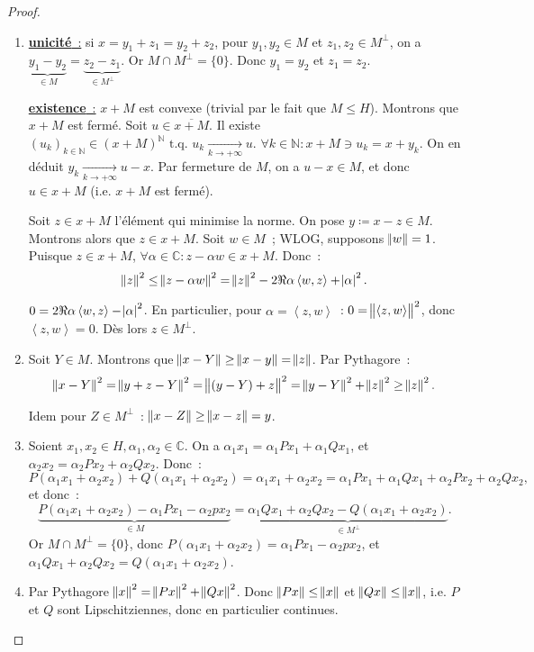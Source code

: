 \documentclass{report}
\newcommand{\C}{{\mathbb C}}
\newcommand{\N}{{\mathbb N}}
\newcommand{\scpr}[2]{\left\langle#1, #2\right\rangle}
\newcommand{\tq}{\text{ t.q. }}
\newcommand{\pinfty}{{+\infty}}
\newcommand{\unic}{{\underline {\textbf{unicité}~:}} }
\newcommand{\exis}{{\underline {\textbf{existence}~:}} }
\theoremstyle{definition}
\theoremstyle{remark}
\begin{document}
\begin{proof}~
\begin{enumerate}
	\item \unic si $x = y_1+z_1 = y_2+z_2$, pour $y_1,y_2 \in M$ et $z_1,z_2 \in M^\perp$, on a
	$\underbrace {y_1-y_2}_{\in M} = \underbrace {z_2-z_1}_{\in M^\perp}$. Or $M \cap M^\perp = \{0\}$. Donc $y_1=y_2$ et $z_1=z_2$.

 	\exis $x+M$ est convexe (trivial par le fait que $M \leq H$). Montrons que $x+M$ est fermé. Soit $u \in \overline {x+M}$.
	Il existe $(u_k)_{k \in \N} \in {(x+M)^\N} \tq u_k \xrightarrow[k \to \pinfty]{} u$. $\forall k \in \N : x+M \ni u_k = x + y_k$. On en déduit
	$y_k \xrightarrow[k \to \pinfty]{} u-x$. Par fermeture de $M$, on a $u-x \in M$, et donc $u \in x+M$ (i.e. $x+M$ est fermé).

	Soit $z \in x+M$ l'élément qui minimise la norme. On pose $y \coloneqq x-z \in M$. Montrons alors que $z \in x+M$. Soit $w \in M$~; WLOG, supposons $\norm w = 1$.
	Puisque $z \in x+M$, $\forall \alpha \in \C : z-\alpha w \in x+M$. Donc~:
	\[\norm z^2 \leq \norm {z-\alpha w}^2 = \norm z^2 - 2\Re\alpha\scpr wz + \abs\alpha^2.\]

	$0 = 2\Re\alpha\scpr wz - \abs\alpha^2$. En particulier, pour $\alpha = \scpr zw$~: $0 = \norm {\scpr zw}^2$, donc $\scpr zw = 0$. Dès lors $z \in M^\perp$.

	\item Soit $Y \in M$. Montrons que $\norm {x-Y} \geq \norm {x-y} = \norm z$. Par Pythagore~:
	\[\norm {x-Y}^2 = \norm {y+z-Y}^2 = \norm {(y-Y) + z}^2 = \norm {y-Y}^2 + \norm z^2 \geq \norm z^2.\]

	Idem pour $Z \in M^\perp$~: $\norm {x-Z} \geq \norm {x-z} = y$.

	\item Soient $x_1, x_2 \in H, \alpha_1, \alpha_2 \in \C$. On a $\alpha_1x_1 = \alpha_1Px_1 + \alpha_1Qx_1$, et $\alpha_2x_2 = \alpha_2Px_2 + \alpha_2Qx_2$. Donc~:
	\[P(\alpha_1x_1+\alpha_2x_2) + Q(\alpha_1x_1 + \alpha_2x_2) = \alpha_1x_1 + \alpha_2x_2 = \alpha_1Px_1 + \alpha_1Qx_1 + \alpha_2Px_2 + \alpha_2Qx_2,\]
	et donc~:
	\[\underbrace {P(\alpha_1x_1+\alpha_2x_2) - \alpha_1Px_1 - \alpha_2px_2}_{\in M} = \underbrace {\alpha_1Qx_1 + \alpha_2Qx_2 - Q(\alpha_1x_1 + \alpha_2x_2)}_{\in M^\perp}.\]
	Or $M \cap M^\perp = \{0\}$, donc $P(\alpha_1x_1+\alpha_2x_2) = \alpha_1Px_1 - \alpha_2px_2$, et $\alpha_1Qx_1 + \alpha_2Qx_2 = Q(\alpha_1x_1 + \alpha_2x_2)$.

	\item Par Pythagore $\norm x^2 = \norm {Px}^2 + \norm {Qx}^2$. Donc $\norm {Px} \leq \norm x$ et $\norm {Qx} \leq \norm x$, i.e. $P$ et $Q$ sont Lipschitziennes,
	donc en particulier continues.
\end{enumerate}
\end{proof}
\end{document}
